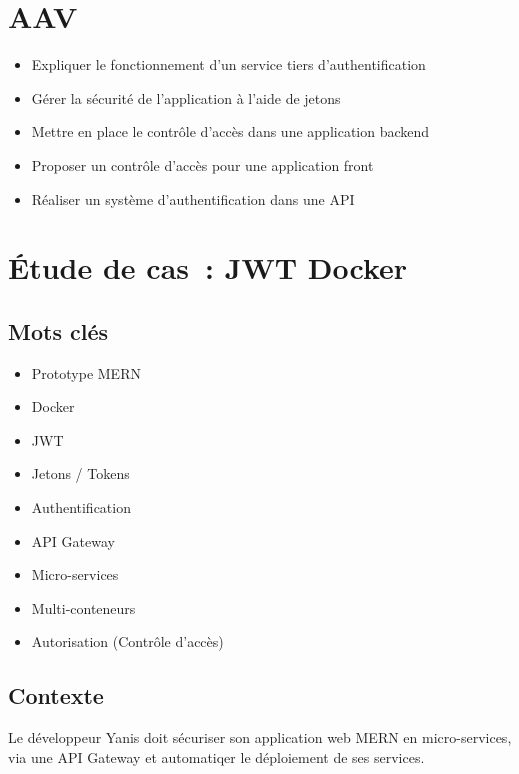 \newpage

\section*{AAV}
\begin{itemize}
	\item [1] Expliquer le fonctionnement d'un service tiers d'authentification
	\item [5] Gérer la sécurité de l'application à l'aide de jetons
	\item [5] Mettre en place le contrôle d'accès dans une application backend
	\item [4] Proposer un contrôle d'accès pour une application front
	\item [3] Réaliser un système d'authentification dans une API
\end{itemize}

\newpage

\section*{Étude de cas~: JWT Docker}

\subsection*{Mots clés}
{}
\begin{itemize}
	\item Prototype MERN
	\item Docker
	\item JWT
	\item Jetons / Tokens
	\item Authentification
	\item API Gateway
	\item Micro-services
	\item Multi-conteneurs
	\item Autorisation (Contrôle d'accès)
\end{itemize}

\subsection*{Contexte}
{}
\noindent Le développeur Yanis doit sécuriser son application web MERN en micro-services, via une API Gateway et automatiqer le déploiement de ses services.

